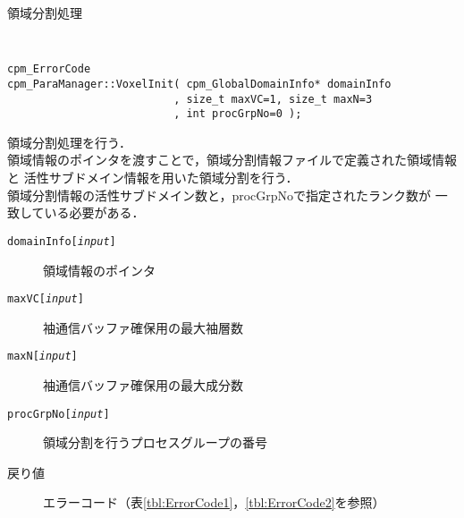 \begin{spacing}{0.8}
\begin{itembox}[l]{領域分割処理}
{\tt
\begin{verbatim}
cpm_ErrorCode
cpm_ParaManager::VoxelInit( cpm_GlobalDomainInfo* domainInfo
                          , size_t maxVC=1, size_t maxN=3
                          , int procGrpNo=0 );
\end{verbatim}
}
領域分割処理を行う．\\
領域情報のポインタを渡すことで，領域分割情報ファイルで定義された領域情報と
活性サブドメイン情報を用いた領域分割を行う．\\
領域分割情報の活性サブドメイン数と，procGrpNoで指定されたランク数が
一致している必要がある．
\begin{description}
\item[{\tt domainInfo[{\it input}]}] 領域情報のポインタ
\item[{\tt maxVC[{\it input}]}] 袖通信バッファ確保用の最大袖層数
\item[{\tt maxN[{\it input}]}] 袖通信バッファ確保用の最大成分数
\item[{\tt procGrpNo[{\it input}]}] 領域分割を行うプロセスグループの番号
\\
\item[戻り値] エラーコード（表\ref{tbl:ErrorCode1}，\ref{tbl:ErrorCode2}を参照）
\end{description}
\end{itembox}\\
\end{spacing}

